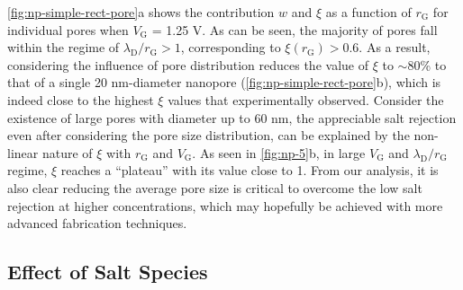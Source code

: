 \autoref{fig:np-simple-rect-pore}a shows the contribution $w$ and $\xi$ as
a function of $r_{\mathrm{G}}$ for individual pores when
$V_{\mathrm{G}}$ = 1.25 V. As can be seen, the majority of pores fall
within the regime of $\lambda_{\mathrm{D}} / r_{\mathrm{G}} > 1$,
corresponding to $\xi(r_{\mathrm{G}}) > 0.6$. As a result, considering
the influence of pore distribution reduces the value of $\xi$ to $\sim{}$80\% to
that of a single 20 nm-diameter nanopore (\autoref{fig:np-simple-rect-pore}b), which is indeed close to the highest
$\xi$ values that experimentally observed.
%
Consider the existence of large pores with diameter up to 60 nm, the
appreciable salt rejection even after considering the pore size
distribution, can be explained by the non-linear nature of $\xi$ with
$r_{\mathrm{G}}$ and $V_{\mathrm{G}}$. As seen in \autoref{fig:np-5}b,
in large $V_{\mathrm{G}}$ and $\lambda_{\mathrm{D}} / r_{\mathrm{G}}$
regime, $\xi$ reaches a ``plateau'' with its value close to 1.
%
From our
analysis, it is also clear reducing the average pore size is critical
to overcome the low salt rejection at higher concentrations, which may
hopefully be achieved with more advanced fabrication techniques.


\subsection{Effect of Salt Species}
\label{sec:np-salts}

